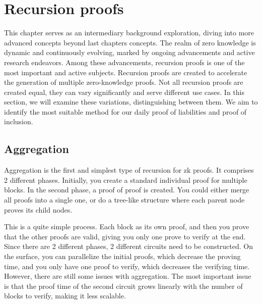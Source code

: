 

\chapter{Recursion proofs}

This chapter serves as an intermediary background exploration,
diving into more advanced concepts beyond last chapters concepts.
The realm of zero knowledge is dynamic and continuously evolving,
marked by ongoing advancements and active research endeavors. Among these advancements,
recursion proofs is one of the most important and active subjects. Recursion proofs are created to accelerate
the generation of multiple zero-knowledge proofs.
Not all recursion proofs are created equal, they can vary significantly and serve different use cases.
In this section, we will examine these variations, distinguishing between them.
We aim to identify the most suitable method for our daily proof of liabilities and proof of inclusion.


\section{Aggregation}
Aggregation is the first and simplest type of recursion for zk proofs. It comprises 2 different phases.
Initially, you create a standard individual proof for multiple blocks. In the second phase, a proof of proof is created.
You could either merge all proofs into a single one, or do a tree-like structure where each parent node proves its child nodes.

This is a quite simple process. Each block as its own proof, and then you prove that the other proofs are valid, giving you only one prove
to verify at the end. Since there are 2 different phases, 2 different circuits need to be constructed.
On the surface, you can parallelize the initial proofs, which decrease the proving time, and you only have one proof to verify, which decreases the verifying time.
However, there are still some issues with aggregation. The most important issue is that the proof time of the second circuit grows linearly with the number of blocks to verify, making it less scalable. \cite{Nova23}

